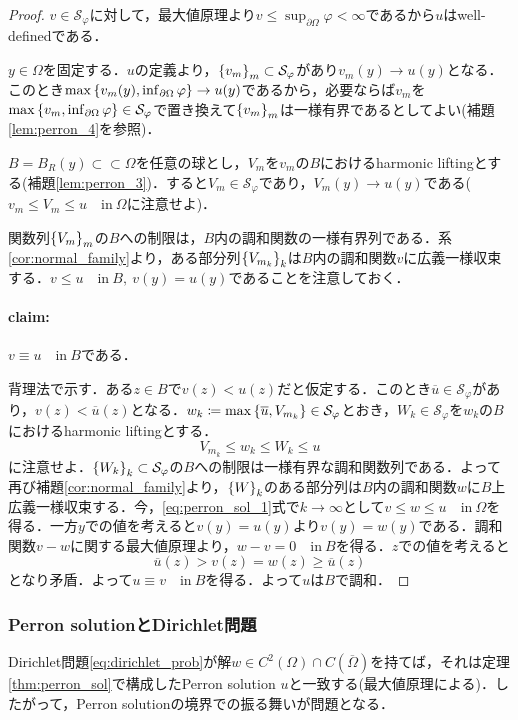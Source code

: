 \documentclass[a4paper]{ltjsarticle}
\newcommand{\Om}{\Omega}
\newcommand{\pOm}{\partial\Omega}
\newcommand{\Ombar}{\overline{\Omega}}
\newcommand{\ssubset}{\subset\subset}
\newcommand{\inn}{\quad\text{in}\ }
\newcommand{\1}{\mathbbm{1}}
\numberwithin{equation}{section}
\theoremstyle{definition}
\begin{document}
\begin{proof}
    $v\in\mathcal{S}_{\varphi}$に対して，最大値原理より$v\leq \sup_{\pOm}\varphi<\infty$であるから$u$はwell-definedである．

    $y\in \Om$を固定する．$u$の定義より，$\qty{v_m}_{m}\subset \mathcal{S}_{\varphi}$があり$v_m(y)\to u(y)$となる．このとき$\max\qty{v_m(y),\inf_{\pOm}\varphi}\to u(y)$であるから，必要ならば$v_m$を$\max\qty{v_m,\inf_{\pOm}\varphi}\in \mathcal{S}_{\varphi}$で置き換えて$\qty{v_m}_m$は一様有界であるとしてよい(補題\ref{lem:perron_4}を参照)．

    $B=B_R(y)\ssubset \Om$を任意の球とし，$V_m$を$v_m$の$B$におけるharmonic liftingとする(補題\ref{lem:perron_3})．すると$V_m\in \mathcal{S}_{\varphi}$であり，$V_m(y)\to u(y)$である($v_m\leq V_m\leq u\inn \Om$に注意せよ)．

    関数列$\qty{V_m}_m$の$B$への制限は，$B$内の調和関数の一様有界列である．系\ref{cor:normal_family}より，ある部分列$\qty{V_{m_k}}_{k}$は$B$内の調和関数$v$に広義一様収束する．$v\leq u\inn B,\ v(y)=u(y)$であることを注意しておく．

    \paragraph*{claim:}$v\equiv u\inn B$である．

    背理法で示す．ある$z\in B$で$v(z)<u(z)$だと仮定する．このとき$\overline{u}\in \mathcal{S}_{\varphi}$があり，$v(z)<\overline{u}(z)$となる．$w_{k}\coloneqq\max\qty{\overline{u},V_{m_k}}\in \mathcal{S}_{\varphi}$とおき，$W_{k}\in \mathcal{S}_{\varphi}$を$w_{k}$の$B$におけるharmonic liftingとする．
    \begin{equation}
        V_{m_k}\leq w_k\leq W_{k}\leq u\label{eq:perron_sol_1}    
    \end{equation}
    に注意せよ．$\qty{W_{k}}_{k}\subset \mathcal{S}_{\varphi}$の$B$への制限は一様有界な調和関数列である．よって再び補題\ref{cor:normal_family}より，$\qty{W}_{k}$のある部分列は$B$内の調和関数$w$に$B$上広義一様収束する．今，\eqref{eq:perron_sol_1}式で$k\to\infty$として$v\leq w\leq u\inn\Om$を得る．一方$y$での値を考えると$v(y)=u(y)$より$v(y)=w(y)$である．調和関数$v-w$に関する最大値原理より，$w-v=0\inn B$を得る．$z$での値を考えると
    \begin{equation}
        \overline{u}(z)>v(z)=w(z)\geq \overline{u}(z)
    \end{equation}
    となり矛盾．よって$u\equiv v\inn B$を得る．よって$u$は$B$で調和．
\end{proof}
\subsubsection{Perron solutionとDirichlet問題}
Dirichlet問題\eqref{eq:dirichlet_prob}が解$w\in C^2(\Om)\cap C(\Ombar)$を持てば，それは定理\ref{thm:perron_sol}で構成したPerron solution $u$と一致する(最大値原理による)．したがって，Perron solutionの境界での振る舞いが問題となる．
\end{document}
